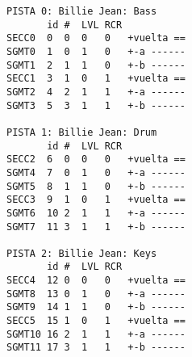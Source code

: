 \begin{verbatim}
PISTA 0: Billie Jean: Bass 
       id #  LVL RCR
SECC0  0  0  0   0   +vuelta ==
SGMT0  1  0  1   0   +-a ------
SGMT1  2  1  1   0   +-b ------
SECC1  3  1  0   1   +vuelta ==
SGMT2  4  2  1   1   +-a ------
SGMT3  5  3  1   1   +-b ------

PISTA 1: Billie Jean: Drum 
       id #  LVL RCR
SECC2  6  0  0   0   +vuelta ==
SGMT4  7  0  1   0   +-a ------
SGMT5  8  1  1   0   +-b ------
SECC3  9  1  0   1   +vuelta ==
SGMT6  10 2  1   1   +-a ------
SGMT7  11 3  1   1   +-b ------

PISTA 2: Billie Jean: Keys 
       id #  LVL RCR
SECC4  12 0  0   0   +vuelta ==
SGMT8  13 0  1   0   +-a ------
SGMT9  14 1  1   0   +-b ------
SECC5  15 1  0   1   +vuelta ==
SGMT10 16 2  1   1   +-a ------
SGMT11 17 3  1   1   +-b ------
\end{verbatim}
